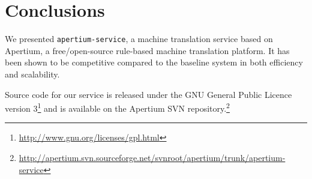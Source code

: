 \documentclass[11pt]{article}
\begin{document}
%
%
%
%
%




\section{Conclusions}

We presented {\tt\small apertium-service}, a machine translation service based on Apertium, a free/open-source rule-based machine translation platform. It has been shown to be competitive compared to the baseline system in both efficiency and scalability.

Source code for our service is released under the GNU General Public Licence version 3\footnote{\url{http://www.gnu.org/licenses/gpl.html}} and is available on the Apertium SVN repository.\footnote{{\small\url{http://apertium.svn.sourceforge.net/svnroot/apertium/trunk/apertium-service}}}
\end{document}
